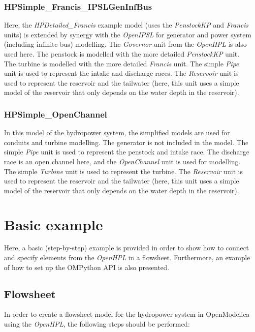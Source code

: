 \documentclass[%
]{USN-PhD}
\begin{document}
\subsection{HPSimple\_Francis\_IPSLGenInfBus}

Here, the \emph{HPDetailed\_Francis} example model (uses the \emph{PenstockKP} and \emph{Francis} units) is extended by synergy with the \emph{OpenIPSL} for generator and power system (including infinite bus) modelling. The \emph{Governor} unit from the \emph{OpenHPL} is also used here. The penstock is modelled with the more detailed \emph{PenstockKP} unit. The turbine is modelled with the more detailed \emph{Francis} unit. The simple \emph{Pipe} unit is used to represent the intake and discharge races. The \emph{Reservoir} unit is used to represent the reservoir and the tailwater  (here, this unit uses a simple model of the reservoir that only depends on the water depth in the reservoir).

\subsection{HPSimple\_OpenChannel}

In this model of the hydropower system, the simplified models are used for conduits and turbine modelling. The generator is not included in the model. The simple \emph{Pipe} unit is used to represent the penstock and intake race. The discharge race is an open channel here, and the \emph{OpenChannel} unit is used for modelling. The simple \emph{Turbine} unit is used to represent the turbine. The \emph{Reservoir} unit is used to represent the reservoir and the tailwater  (here, this unit uses a simple model of the reservoir that only depends on the water depth in the reservoir).

\chapter{Basic example}

Here, a basic (step-by-step) example is provided in order to show how to connect and specify elements from the \emph{OpenHPL} in a flowsheet. Furthermore, an example of how to set up the OMPython API is also presented.

\section{Flowsheet}

In order to create a flowsheet model for the hydropower system in OpenModelica using the \emph{OpenHPL}, the following steps should be performed:
\end{document}

